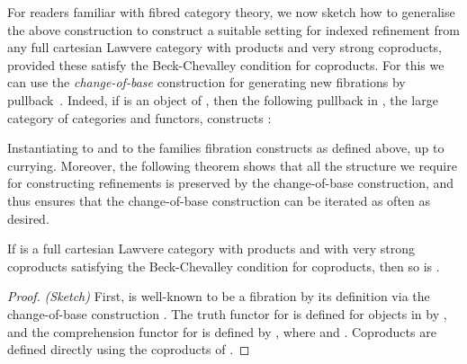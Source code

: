 \documentclass{LMCS}
\begin{document}
\vspace*{0.1in}

For readers familiar with fibred category theory, we now sketch how to
generalise the above construction to construct a suitable setting for
indexed refinement from any full cartesian Lawvere category with
products and very strong coproducts, provided these satisfy the
Beck-Chevalley condition for coproducts. For this we can use the
\emph{change-of-base} construction for generating new fibrations by
pullback~\cite{jacobs99book}. Indeed, if  is an object of
, then the following pullback in , the large
category of categories and functors, constructs :

\noindent
Instantiating  to  and  to the families
fibration constructs  as
defined above, up to currying. Moreover, the following theorem shows
that all the structure we require for constructing refinements is
preserved by the change-of-base construction, and thus ensures that
the change-of-base construction can be iterated as often as desired.

\begin{thm}\label{thm:change-of-base}
  If  is a full cartesian Lawvere category with products and with
  very strong coproducts satisfying the Beck-Chevalley condition for
  coproducts, then so is .
\end{thm}

\begin{proof}\emph{(Sketch)}
  First,  is well-known to be a fibration by its definition via
  the change-of-base construction \cite{jacobs99book}. The truth
  functor for  is defined for objects  in  by
  , and the comprehension functor for 
  is defined by , where  and . Coproducts are
  defined directly using the coproducts of .
\end{proof}
\end{document}
